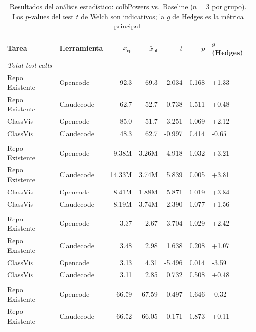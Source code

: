\usepackage{booktabs}
\usepackage{siunitx}

\begin{table}[ht]
  \centering
  \caption{Resultados del análisis estadístico: colbPowers vs.\ Baseline ($n=3$ por grupo). Los $p$-values del test $t$ de Welch son indicativos; la $g$ de Hedges es la métrica principal.}
  \label{tab:ttest_cpbl}
  \begin{tabular}{llrrrrl}
    \toprule
    Tarea & Herramienta & $\bar{x}_\text{cp}$ & $\bar{x}_\text{bl}$ & $t$ & $p$ & $g$ (Hedges) \\
    \midrule
    \multicolumn{7}{l}{\textit{Total tool calls}} \\
    \quad Repo Existente & Opencode & 92.3 & 69.3 & 2.034 & 0.168 & +1.33 \\
    \quad Repo Existente & Claudecode & 62.7 & 52.7 & 0.738 & 0.511 & +0.48 \\
    \quad ClassVis & Opencode & 85.0 & 51.7 & 3.251 & 0.069 & +2.12 \\
    \quad ClassVis & Claudecode & 48.3 & 62.7 & -0.997 & 0.414 & -0.65 \\
    \addlinespace
    \multicolumn{7}{l}{\textit{Total tokens}} \\
    \quad Repo Existente & Opencode & 9.38M & 3.26M & 4.918 & 0.032 & +3.21 \\
    \quad Repo Existente & Claudecode & 14.33M & 3.74M & 5.839 & 0.005 & +3.81 \\
    \quad ClassVis & Opencode & 8.41M & 1.88M & 5.871 & 0.019 & +3.84 \\
    \quad ClassVis & Claudecode & 8.19M & 3.74M & 2.390 & 0.077 & +1.56 \\
    \addlinespace
    \multicolumn{7}{l}{\textit{Avg. cyclomatic complexity}} \\
    \quad Repo Existente & Opencode & 3.37 & 2.67 & 3.704 & 0.029 & +2.42 \\
    \quad Repo Existente & Claudecode & 3.48 & 2.98 & 1.638 & 0.208 & +1.07 \\
    \quad ClassVis & Opencode & 3.13 & 4.31 & -5.496 & 0.014 & -3.59 \\
    \quad ClassVis & Claudecode & 3.11 & 2.85 & 0.732 & 0.508 & +0.48 \\
    \addlinespace
    \multicolumn{7}{l}{\textit{Maintainability index}} \\
    \quad Repo Existente & Opencode & 66.59 & 67.59 & -0.497 & 0.646 & -0.32 \\
    \quad Repo Existente & Claudecode & 66.52 & 66.05 & 0.171 & 0.873 & +0.11 \\

\end{tabular}
\end{table}
